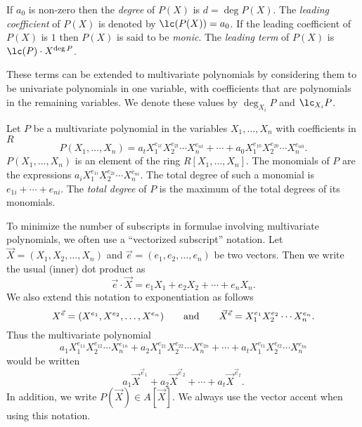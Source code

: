 If $a_{0}$ is non-zero then the {\em degree} of $P(X)$ is $d = \deg
P(X)$. The {\em leading coefficient} of
$P(X)$ is denoted by $\lc (P(X)) = a_{0}$. If the leading coefficient of $P(X)$ is $1$ then $P(X)$
is said to be {\em monic}. The {\em leading
term} of $P(X)$ is $\lc(P) \cdot X^{\deg P}$.

These terms can be extended to multivariate polynomials by considering
them to be univariate polynomials in one variable, with coefficients
that are polynomials in the remaining variables. We denote these values by $\deg_{X_{i}} P$ and
$\lc_{X_{i}} P$.

Let $P$ be a multivariate polynomial in the variables $X_{1}, \ldots,
X_{n}$ with coefficients in $R$
\[
P(X_{1}, \ldots, X_{n}) = 
a_{t} X_{1}^{e_{1t}} X_{2}^{e_{2t}} \cdots X_{n}^{e_{nt}}
+
\cdots
+
a_{0} X_{1}^{e_{10}} X_{2}^{e_{20}} \cdots X_{n}^{e_{n0}}.
\]
$P(X_{1}, \ldots, X_{n})$ is an element of the ring $R[X_{1}, \ldots,
X_{n}]$.  The monomials of $P$ are the expressions $a_{i}
X_{1}^{e_{1i}} X_{2}^{e_{2i}} \cdots X_{n}^{e_{ni}}$.  The total
degree of such a monomial is $e_{1i} + \cdots + e_{ni}$.  The {\em
total degree} of $P$ is the maximum of the total degrees of its
monomials.

To minimize the number of subscripts in formulae involving
multivariate polynomials, we often use a ``vectorized subscript''
notation.  Let $\vec X = (X_1, X_2, \ldots, X_n)$ and $\vec e = (e_1,
e_2, \ldots, e_n)$ be two vectors.  Then we write the usual (inner)
dot product as
\[
\vec e \cdot \vec X = e_1 X_1 + e_2 X_2 + \cdots + e_n X_n.
\]
We also extend this notation to exponentiation as follows 
\[
X^{\vec e} = (X^{e_1}, X^{e_2},\ldots, X^{e_n})
\qquad\hbox{and}\qquad 
{\vec X}^{\vec e} = X_1^{e_1} X_2^{e_2} \cdots X_n^{e_n}.
\]
Thus the multivariate polynomial
\[
a_1 X_1^{e_{11}} X_2^{e_{12}} \cdots X_n^{e_{1n}}+ a_2 X_1^{e_{21}} X_2^{e_{22}} \cdots X_n^{e_{2n}} + 
\cdots + a_t X_1^{e_{t1}} X_2^{e_{t2}} \cdots X_n^{e_{tn}}
\]
would be written
\[
a_1 \vec X^{\vec e_1} + a_2 \vec X^{\vec e_2} 
  + \cdots + a_t \vec X^{\vec e_t}.
\]
In addition, we write $P(\vec X) \in A[\vec X]$.  We always use the
vector accent when using this notation.



